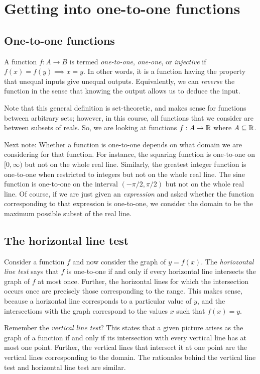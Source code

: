 \documentclass[10pt]{amsart}
\begin{document}
\section{Getting into one-to-one functions}

\subsection{One-to-one functions}

A function $f: A \to B$ is termed {\em one-to-one}, {\em one-one}, or
{\em injective} if $f(x) = f(y) \implies x = y$. In other words, it is
a function having the property that unequal inputs give unequal
outputs. Equivalently, we can {\em reverse} the function in the sense
that knowing the output allows us to deduce the input.

Note that this general definition is set-theoretic, and makes sense
for functions between arbitrary sets; however, in this course, all
functions that we consider are between subsets of reals. So, we are
looking at functions $f:A \to \mathbb{R}$ where $A \subseteq \mathbb{R}$.

Next note: Whether a function is one-to-one depends on what domain we
are considering for that function. For instance, the squaring function
is one-to-one on $[0,\infty)$ but not on the whole real
line. Similarly, the greatest integer function is one-to-one when
restricted to integers but not on the whole real line. The sine
function is one-to-one on the interval $(-\pi/2,\pi/2)$ but not on the
whole real line. Of course, if we are just given an {\em expression}
and asked whether the function corresponding to that expression is
one-to-one, we consider the domain to be the maximum possible subset
of the real line.

\subsection{The horizontal line test}

Consider a function $f$ and now consider the graph of $y = f(x)$. The
{\em horiozontal line test} says that $f$ is one-to-one if and only if
every horizontal line intersects the graph of $f$ at most
once. Further, the horizontal lines for which the intersection occurs
once are precisely those corresponding to the range. This makes sense,
because a horizontal line corresponds to a particular value of $y$,
and the intersections with the graph correspond to the values $x$ such
that $f(x) = y$.

Remember the {\em vertical line test}? This states that a given
picture arises as the graph of a function if and only if its
intersection with every vertical line has at most one point. Further,
the vertical lines that intersect it at one point are the vertical
lines corresponding to the domain. The rationales behind the vertical
line test and horizontal line test are similar.
\end{document}
